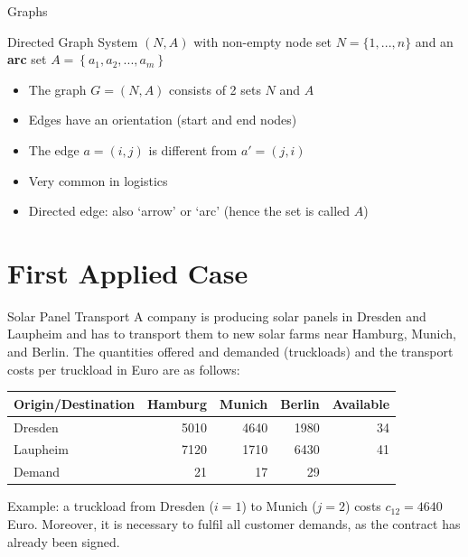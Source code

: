 \documentclass[aspectratio=1610,12pt]{beamer}
\begin{document}
\begin{frame}{Graphs}
\begin{block}{Directed Graph}
\vspace{0.15cm}
System $(N,A)$ with non-empty node set $N = \{1,...,n \}$ and
an \textbf{arc} set $A = \left\{a_1,a_2,...,a_m \right\}$ 
\end{block}
\begin{itemize}
    \item The graph $G=(N,A)$ consists of 2 sets $N$ and $A$
	\item Edges have an orientation (start and end nodes)
	\item The edge $a=(i,j)$ is different from $a'=(j,i)$
	\item Very common in logistics
	\item Directed edge: also `arrow' or `arc' (hence the set is called $A$)
\end{itemize}
\end{frame}

\section{First Applied Case}

\begin{frame}{Solar Panel Transport}
A company is producing solar panels in Dresden and Laupheim and has to transport them to new solar farms near Hamburg, Munich, and Berlin. The quantities offered and demanded (truckloads) and the transport costs per truckload in Euro are as follows:
\begin{center}
\begin{tabular}{l|rrr|r}
\hline
Origin/Destination     & Hamburg & Munich & Berlin & Available\\
\hline
Dresden    &  5010     &  4640     &  1980   & 34\\
Laupheim   &  7120     &  1710     &  6430   & 41\\                      
\hline
Demand     &    21     &   17      &    29   &\\
\hline      
\end{tabular}
\end{center}
Example: a truckload from Dresden ($i=1$) to Munich ($j=2$) costs $c_{12}=4640$ Euro. Moreover, it is necessary to fulfil all customer demands, as the contract has already been signed.
\end{frame}
\end{document}

